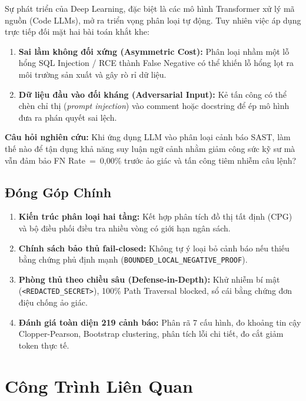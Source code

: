 \documentclass[12pt, a4paper]{article}
\begin{document}
Sự phát triển của Deep Learning, đặc biệt là các mô hình Transformer
xử lý mã nguồn (Code LLMs), mở ra triển vọng phân loại tự động. Tuy
nhiên việc áp dụng trực tiếp đối mặt hai bài toán khắt khe:

\begin{enumerate}
  \item \textbf{Sai lầm không đối xứng (Asymmetric Cost):} Phân loại nhầm
        một lỗ hổng SQL Injection / RCE thành False Negative có thể khiến
        lỗ hổng lọt ra môi trường sản xuất và gây rò rỉ dữ liệu.
  \item \textbf{Dữ liệu đầu vào đối kháng (Adversarial Input):} Kẻ tấn
        công có thể chèn chỉ thị (\emph{prompt injection}) vào comment
        hoặc docstring để ép mô hình đưa ra phán quyết sai lệch.
\end{enumerate}

\noindent\textbf{Câu hỏi nghiên cứu:} Khi ứng dụng LLM vào phân loại
cảnh báo SAST, làm thế nào để tận dụng khả năng suy luận ngữ cảnh nhằm
giảm công sức kỹ sư mà vẫn đảm bảo FN Rate~=~0,00\% trước ảo giác và
tấn công tiêm nhiễm câu lệnh?

\subsection*{Đóng Góp Chính}

\begin{enumerate}
  \item \textbf{Kiến trúc phân loại hai tầng:} Kết hợp phân tích đồ thị
        tất định (CPG) và bộ điều phối điều tra nhiều vòng có giới hạn ngân
        sách.
  \item \textbf{Chính sách bảo thủ fail-closed:} Không tự ý loại bỏ cảnh
        báo nếu thiếu bằng chứng phủ định mạnh
        (\texttt{BOUNDED\_LOCAL\_NEGATIVE\_PROOF}).
  \item \textbf{Phòng thủ theo chiều sâu (Defense-in-Depth):} Khử nhiễm
        bí mật (\texttt{<REDACTED\_SECRET>}), 100\% Path Traversal blocked,
        sổ cái bằng chứng đơn điệu chống ảo giác.
  \item \textbf{Đánh giá toàn diện 219 cảnh báo:} Phân rã 7 cấu hình, đo
        khoảng tin cậy Clopper-Pearson, Bootstrap clustering, phân tích lỗi
        chi tiết, đo cắt giảm token thực tế.
\end{enumerate}

\section{Công Trình Liên Quan}
\end{document}
